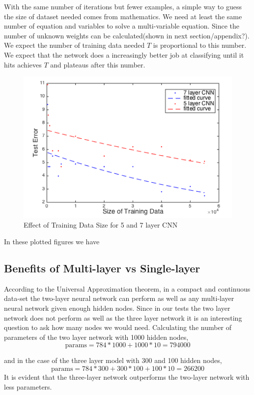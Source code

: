 \documentclass[12pt, twocolumn]{article}
\begin{document}
With the same number of iterations but fewer examples, a simple way to guess the size of dataset needed comes from mathematics.  We need at least the same number of equation and variables to solve a multi-variable equation. Since the number of unknown weights can be calculated(shown in next section/appendix?). We expect the number of training data needed $T$ is proportional to this number. We expect that the network does a increasingly better job at classifying until it hits achieves $T$ and plateaus after this number.

 \begin{figure}
\includegraphics[scale=.5]{trainingsize.png}
\caption{Effect of Training Data Size for 5 and 7 layer CNN}
\label{fig:trainsize}
\end{figure}


In these plotted figures we have 



\subsection{Benefits of Multi-layer vs Single-layer}
According to the Universal Approximation theorem, in a compact and continuous data-set the two-layer neural network can perform as well as any multi-layer neural network given enough hidden nodes. Since in our tests the two layer network does not perform as well as the three layer network it is an interesting question to ask how many nodes we would need. Calculating the number of parameters of the two layer network with 1000 hidden nodes, 
\begin{equation*}
\textrm{params} = 784*1000 + 1000* 10 = 794000
\end{equation*}

and in the case of the three layer model with 300 and 100 hidden nodes,
\begin{equation*}
\textrm{params} = 784*300 + 300*100 + 100* 10 = 266200
\end{equation*}
It is evident that the three-layer network outperforms the two-layer network with less parameters. 
\end{document}
